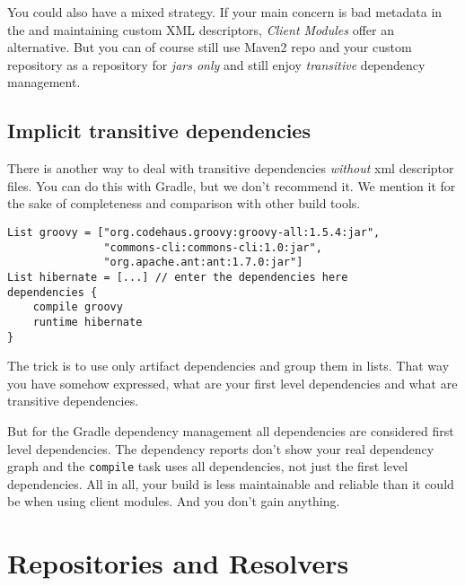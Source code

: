You could also have a mixed strategy. If your main concern is bad metadata in the  and maintaining custom XML descriptors, \emph{Client Modules} offer an alternative. But you can of course still use Maven2 repo and your custom repository as a repository for \emph{jars only} and still enjoy \emph{transitive} dependency management.

\subsection{Implicit transitive dependencies} %
\label{sub:implicit_transitive_dependencies}
There is another way to deal with transitive dependencies \emph{without} xml descriptor files. You can do this with Gradle, but we don't recommend it. We mention it for the sake of completeness and comparison with other build tools.
\begin{Verbatim}
List groovy = ["org.codehaus.groovy:groovy-all:1.5.4:jar",
               "commons-cli:commons-cli:1.0:jar",
               "org.apache.ant:ant:1.7.0:jar"]
List hibernate = [...] // enter the dependencies here
dependencies {
	compile groovy
	runtime hibernate
}
\end{Verbatim}
The trick is to use only artifact dependencies and group them in lists. That way you have somehow expressed, what are your first level dependencies and what are transitive dependencies.

But for the Gradle dependency management all dependencies are considered first level dependencies. The dependency reports don't show your real dependency graph and the \texttt{compile} task uses all dependencies, not just the first level dependencies. All in all, your build is less maintainable and reliable than it could be when using client modules. And you don't gain anything.

\section{Repositories and Resolvers} %
\label{sec:repositories}

